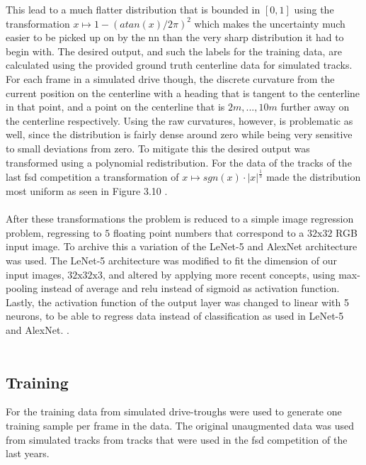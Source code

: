 This lead to a much flatter distribution that is bounded in $[0,1]$ using the transformation $x \mapsto 1-(atan(x)/2\pi)^2$ which makes the uncertainty much easier to be picked up on by the \ac{nn}\cite{Sola1997} than the very sharp distribution it had to begin with. 
The desired output, and such the labels for the training data, are calculated using the provided ground truth centerline data for simulated tracks. For each frame in a simulated drive though, the discrete curvature from the current position on the centerline with a heading that is tangent to the centerline in that point, and a point on the centerline that is $2m, ..., 10m$ further away on the centerline respectively. Using the raw curvatures, however, is problematic as well, since the distribution is fairly dense around zero while being very sensitive to small deviations from zero. To mitigate this the desired output was transformed using a polynomial redistribution. For the data of the tracks of the last \ac{fsd} competition a transformation of $x \mapsto sgn(x)\cdot |x|^\frac{1}{3}$ made the distribution most uniform as seen in Figure 3.10
. \\
\\
After these transformations the problem is reduced to a simple image regression problem, regressing to $5$ floating point numbers that correspond to a $32\text{x}32$ RGB input image. To archive this a variation of the  LeNet-5\cite{Lecun1998} and AlexNet\cite{Alex2012} architecture was used. The LeNet-5 architecture was modified to fit the dimension of our input images, $32\text{x}32\text{x}3$, and altered by applying more recent concepts, using max-pooling instead of average and \ac{relu} instead of sigmoid as activation function. Lastly, the activation function of the output layer was changed to linear with 5 neurons, to be able to regress data instead of classification as used in LeNet-5\cite{Lecun1998} and AlexNet\cite{Alex2012}. 
. \\
\\
\subsection{Training}
For the training data from simulated drive-troughs were used to generate one training sample per frame in the data. The original unaugmented data was used
from simulated tracks from tracks that were used in the \ac{fsd} competition of the last years.